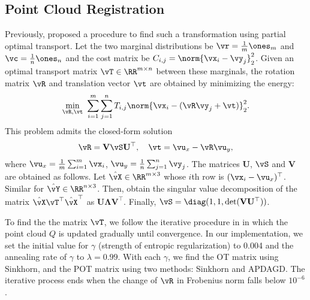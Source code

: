 \subsection{Point Cloud Registration}
Previously, \cite{qin2022rigid} proposed a procedure to find such a transformation using partial optimal transport. Let the two marginal distributions be $\vr = \frac{1}{m} \ones_m$ and $\vc = \frac{1}{n} \ones_n$ and the cost matrix be $C_{i, j} = \norm{\vx_i - \vy_j}_2^2$. Given an optimal transport matrix $\vT \in \RR^{m \times n}$ between these marginals, the rotation matrix $\vR$ and translation vector $\vt$ are obtained by minimizing the energy: 
\begin{align*}
    \min_{\vR, \vt} ~ \sum_{i=1}^{m} \sum_{j=1}^{n} T_{i, j} \norm{\vx_i - (\vR \vy_j + \vt)}_2^2.
\end{align*}
This problem admits the closed-form solution
\begin{align*}
    \vR = \mathbf{V} \vS \mathbf{U}^\top, \quad \vt = \vu_x - \vR \vu_y,
\end{align*}
where $\vu_x = \frac{1}{m} \sum_{i=1}^{m} \vx_i$, $\vu_y = \frac{1}{n} \sum_{j=1}^{n} \vy_j$. The matrices $\mathbf{U}$, $\vS$ and $\mathbf{V}$ are obtained as follows. Let $\hat{\vX} \in \RR^{m \times 3}$ whose $i$th row is $(\vx_i - \vu_x)^\top$. Similar for $\hat{\vY} \in \RR^{n \times 3}$. Then, obtain the singular value decomposition of the matrix $\hat{\vX} \vT^\top \hat{\vX}^\top$ as $\mathbf{U} \mathbf{\Lambda} \mathbf{V}^\top$. Finally, $\vS = \diag(1, 1, \det(\mathbf{V} \mathbf{U}^\top))$.

To find the the matrix $\vT$, we follow the iterative procedure in \cite[Algorithm 1]{qin2022rigid} in which the point cloud $Q$ is updated gradually until convergence. In our implementation, we set the initial value for $\gamma$ (strength of entropic regularization) to 0.004 and the annealing rate of $\gamma$ to $\lambda = 0.99$. With each $\gamma$, we find the OT matrix using Sinkhorn, and the POT matrix using two methods: Sinkhorn and APDAGD. The iterative process ends when the change of $\vR$ in Frobenius norm falls below $10^{-6}$.
